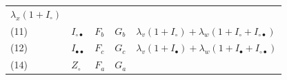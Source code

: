 \documentclass[10pt,]{article}
\begin{document}
\begin{longtable}[]{@{}lllll@{}}
\begin{minipage}[t]{0.17\columnwidth}
\(\lambda_x(1+I_\circ)\)\strut
\end{minipage}\tabularnewline
\begin{minipage}[t]{0.17\columnwidth}\raggedright
(11)\strut
\end{minipage} & \begin{minipage}[t]{0.17\columnwidth}\raggedright
\(I_{\circ\bullet}\)\strut
\end{minipage} & \begin{minipage}[t]{0.17\columnwidth}\raggedright
\(F_b\)\strut
\end{minipage} & \begin{minipage}[t]{0.17\columnwidth}\raggedright
\(G_b\)\strut
\end{minipage} & \begin{minipage}[t]{0.17\columnwidth}\raggedright
\(\lambda_v(1+I_\circ)+\lambda_w(1+I_\circ+I_{\circ\bullet})\)\strut
\end{minipage}\tabularnewline
\begin{minipage}[t]{0.17\columnwidth}\raggedright
(12)\strut
\end{minipage} & \begin{minipage}[t]{0.17\columnwidth}\raggedright
\(I_{\bullet\bullet}\)\strut
\end{minipage} & \begin{minipage}[t]{0.17\columnwidth}\raggedright
\(F_c\)\strut
\end{minipage} & \begin{minipage}[t]{0.17\columnwidth}\raggedright
\(G_c\)\strut
\end{minipage} & \begin{minipage}[t]{0.17\columnwidth}\raggedright
\(\lambda_v(1+I_\bullet)+\lambda_w(1+I_\bullet+I_{\circ\bullet})\)\strut
\end{minipage}\tabularnewline
\begin{minipage}[t]{0.17\columnwidth}\raggedright
(14)\strut
\end{minipage} & \begin{minipage}[t]{0.17\columnwidth}\raggedright
\(Z_\circ\)\strut
\end{minipage} & \begin{minipage}[t]{0.17\columnwidth}\raggedright
\(F_a\)\strut
\end{minipage} & \begin{minipage}[t]{0.17\columnwidth}\raggedright
\(G_a\)\strut
\end{minipage} & \begin{minipage}[t]{0.17\columnwidth}\raggedright

\end{minipage}
\end{longtable}
\end{document}
